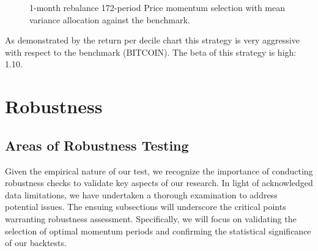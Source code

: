\documentclass{article}
\begin{document}
\begin{figure}[H]
   \centering
    \caption{1-month rebalance 172-period Price momentum selection with mean variance allocation against the benchmark.}
    \label{Strategy_plots}
\end{figure}

As demonstrated by the return per decile chart this strategy is very aggressive with respect to the benchmark (BITCOIN). The beta of this strategy is high: 1.10.
\section{Robustness}\label{sec:robustness}
\subsection{Areas of Robustness Testing}
Given the empirical nature of our test, we recognize the importance of conducting robustness checks to validate key aspects of our research. In light of acknowledged data limitations, we have undertaken a thorough examination to address potential issues. The ensuing subsections will underscore the critical points warranting robustness assessment. Specifically, we will focus on validating the selection of optimal momentum periods and confirming the statistical significance of our backtests.
\end{document}
